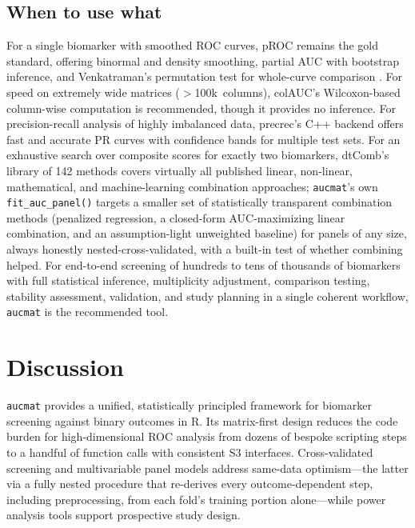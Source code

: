 \documentclass[11pt,a4paper]{article}
\begin{document}
\subsection{When to use what}

For a single biomarker with smoothed ROC curves, pROC remains the gold
standard, offering binormal and density smoothing, partial AUC with bootstrap
inference, and Venkatraman's permutation test for whole-curve comparison
\citep{Venkatraman2000}.  For speed on extremely wide matrices
($>$100k~columns), colAUC's Wilcoxon-based column-wise computation is
recommended, though it provides no inference.  For precision-recall analysis
of highly imbalanced data, precrec's C++ backend offers fast and accurate PR
curves with confidence bands for multiple test sets.  For an exhaustive
search over composite scores for exactly two biomarkers, dtComb's library of
142 methods covers virtually all published linear, non-linear, mathematical,
and machine-learning combination approaches; \texttt{aucmat}'s own
\texttt{fit\_auc\_panel()} targets a smaller set of statistically transparent
combination methods (penalized regression, a closed-form AUC-maximizing
linear combination, and an assumption-light unweighted baseline) for panels
of any size, always honestly nested-cross-validated, with a built-in test of
whether combining helped.  For end-to-end screening of hundreds to tens of
thousands of biomarkers with full statistical inference, multiplicity
adjustment, comparison testing, stability assessment, validation, and study
planning in a single coherent workflow, \texttt{aucmat} is the recommended
tool.

\section{Discussion}

\texttt{aucmat} provides a unified, statistically principled framework for
biomarker screening against binary outcomes in R.  Its matrix-first design
reduces the code burden for high-dimensional ROC analysis from dozens of
bespoke scripting steps to a handful of function calls with consistent S3
interfaces.  Cross-validated screening and multivariable panel models address
same-data optimism---the latter via a fully nested procedure that re-derives
every outcome-dependent step, including preprocessing, from each fold's
training portion alone---while power analysis tools support prospective study
design.
\end{document}
